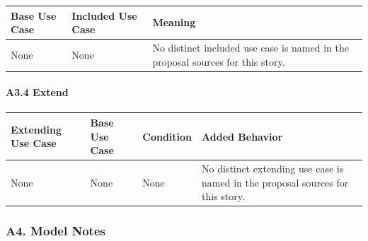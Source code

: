 \documentclass[12pt]{article}
\renewcommand{\baselinestretch}{1.5}
\begin{document}
\begingroup
\small
\renewcommand{\baselinestretch}{1.0}\selectfont
\renewcommand{\arraystretch}{1.15}
\setlength{\tabcolsep}{6pt}
\begin{longtable}{|>{\raggedright\arraybackslash}p{}|>{\raggedright\arraybackslash}p{}|>{\raggedright\arraybackslash}p{}|}
\hline
\textbf{Base Use Case} & \textbf{Included Use Case} & \textbf{Meaning} \\ \hline
\endhead
None & None & No distinct included use case is named in the proposal sources for this story. \\ \hline
\end{longtable}
\endgroup
\par\medskip

\hypertarget{sec:a3-4-extend}{}
\paragraph*{A3.4 Extend}
\par\medskip

\begingroup
\small
\renewcommand{\baselinestretch}{1.0}\selectfont
\renewcommand{\arraystretch}{1.15}
\setlength{\tabcolsep}{6pt}
\begin{longtable}{|>{\raggedright\arraybackslash}p{}|>{\raggedright\arraybackslash}p{}|>{\raggedright\arraybackslash}p{}|>{\raggedright\arraybackslash}p{}|}
\hline
\textbf{Extending Use Case} & \textbf{Base Use Case} & \textbf{Condition} & \textbf{Added Behavior} \\ \hline
\endhead
None & None & None & No distinct extending use case is named in the proposal sources for this story. \\ \hline
\end{longtable}
\endgroup
\par\medskip

\hypertarget{sec:a4-model-notes}{}
\subsubsection*{A4. Model Notes}
\par\medskip
\end{document}
